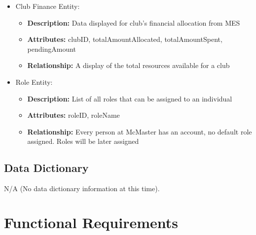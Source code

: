 \documentclass[12pt]{article}
\begin{document}
\begin{itemize}
    \item Club Finance Entity:
      \begin{itemize}
          \item \textbf{Description:} Data displayed for club's financial allocation from MES
          \item \textbf{Attributes:} clubID, totalAmountAllocated, totalAmountSpent, pendingAmount
          \item \textbf{Relationship:} A display of the total resources available for a club 
        \end{itemize}

    \item Role Entity:
      \begin{itemize}
          \item \textbf{Description:} List of all roles that can be assigned to an individual
          \item \textbf{Attributes:} roleID, roleName
          \item \textbf{Relationship:} Every person at McMaster has an account, no default role assigned. Roles will be later assigned
        \end{itemize}
  \end{itemize}
  \subsection{Data Dictionary}
  N/A (No data dictionary information at this time).

\section{Functional Requirements}
\end{document}
